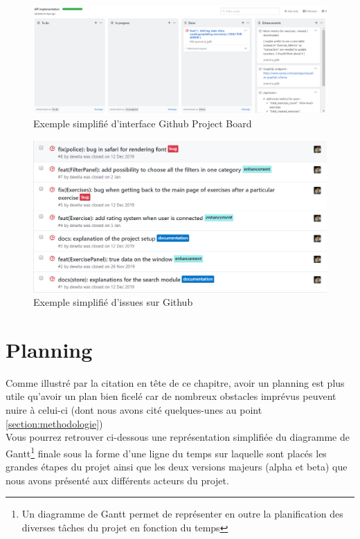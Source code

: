 \begin{figure}[H]
    \includegraphics[width=\textwidth,height=\textheight,keepaspectratio]{images/trelloLike.PNG}
    \centering
    \caption{Exemple simplifié d'interface Github Project Board}
    \label{pic:GithubBoard}
\end{figure}

\begin{figure}[H]
    \includegraphics[width=\textwidth,height=\textheight,keepaspectratio]{images/issueList.PNG}
    \centering
    \caption{Exemple simplifié d'issues sur Github}
    \label{pic:GithubIssues}
\end{figure}

\section{Planning}
Comme illustré par la citation en tête de ce chapitre, avoir un planning est plus utile qu'avoir un plan bien ficelé car de nombreux obstacles imprévus peuvent nuire à celui-ci (dont nous avons cité quelques-unes au point  \ref{section:methodologie})\\

Vous pourrez retrouver ci-dessous une représentation simplifiée du diagramme de Gantt\footnote{Un diagramme de Gantt permet de représenter en outre la planification des diverses tâches du projet en fonction du temps } finale sous la forme d'une ligne du temps sur laquelle sont placés les grandes étapes du projet ainsi que les deux versions majeurs (alpha et beta) que nous avons présenté aux différents acteurs du projet.\\

